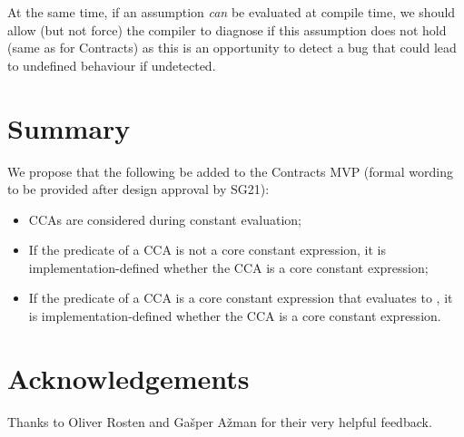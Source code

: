 At the same time, if an assumption \emph{can} be evaluated at compile time, we should allow (but not force) the compiler to diagnose if this assumption does not hold (same as for Contracts) as this is an opportunity to detect a bug that could lead to undefined behaviour if undetected.

\section{Summary}

We propose that the following be added to the Contracts MVP (formal wording to be provided after design approval by SG21):

\begin{itemize}
\item CCAs are considered during constant evaluation;
\item If the predicate of a CCA is not a core constant expression, it is implementation-defined whether the CCA is a core constant expression;
\item If the predicate of a CCA is a core constant expression that evaluates to , it is implementation-defined whether the CCA is a core constant expression.
\end{itemize}




\section*{Acknowledgements}

Thanks to Oliver Rosten and Ga\v sper A\v zman for their very helpful feedback.

\renewcommand{\bibname}{References}




